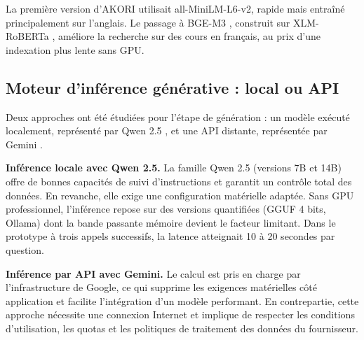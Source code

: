 \documentclass[12pt,a4paper,oneside]{report}
\begin{document}
La première version d'AKORI utilisait all-MiniLM-L6-v2, rapide mais entraîné principalement sur l'anglais. Le passage à BGE-M3 \cite{chen2024bgem3}, construit sur XLM-RoBERTa \cite{conneau2020xlmr}, améliore la recherche sur des cours en français, au prix d'une indexation plus lente sans GPU.

\subsection{Moteur d'inférence générative : local ou API}

Deux approches ont été étudiées pour l'étape de génération : un modèle exécuté localement, représenté par Qwen 2.5 \cite{qwen2024report}, et une API distante, représentée par Gemini \cite{gemini2023}.

\textbf{Inférence locale avec Qwen 2.5.} La famille Qwen 2.5 (versions 7B et 14B) offre de bonnes capacités de suivi d'instructions et garantit un contrôle total des données. En revanche, elle exige une configuration matérielle adaptée. Sans GPU professionnel, l'inférence repose sur des versions quantifiées (GGUF 4 bits, Ollama) dont la bande passante mémoire devient le facteur limitant. Dans le prototype à trois appels successifs, la latence atteignait 10 à 20 secondes par question.

\textbf{Inférence par API avec Gemini.} Le calcul est pris en charge par l'infrastructure de Google, ce qui supprime les exigences matérielles côté application et facilite l'intégration d'un modèle performant. En contrepartie, cette approche nécessite une connexion Internet et implique de respecter les conditions d'utilisation, les quotas et les politiques de traitement des données du fournisseur.
\end{document}
